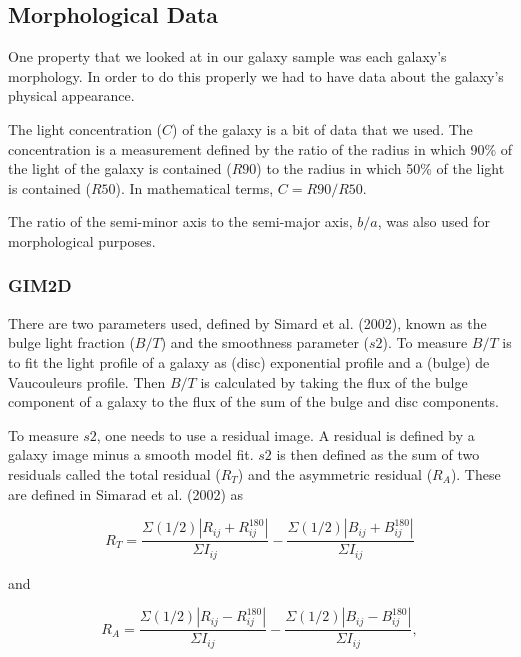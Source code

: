 \documentclass[showcase, preprintnumbers, amsmath, amssymb, bibnotes, 12pt]{revtex4}
\begin{document}
\subsection{Morphological Data}

One property that we looked at in our galaxy sample was each galaxy's morphology. In order to do this properly we had to have data about the galaxy's physical appearance.

The light concentration ($C$) of the galaxy is a bit of data that we used. The concentration is a measurement defined by the ratio of the radius in which 90\% of the light of the galaxy is contained ($R90$) to the radius in which 50\% of the light is contained ($R50$). In mathematical terms, $C=R90/R50$.

The ratio of the semi-minor axis to the semi-major axis, $b/a$, was also used for morphological purposes. %

\subsubsection{GIM2D}

There are two parameters used, defined by Simard et al. (2002), known as the bulge light fraction ($B/T$) and the smoothness parameter ($s2$). To measure $B/T$ is to fit the light profile of a galaxy as (disc) exponential profile and a (bulge) de Vaucouleurs profile. Then $B/T$ is calculated by taking the flux of the bulge component of a galaxy to the flux of the sum of the bulge and disc components. 

To measure $s2$, one needs to use a residual image. A residual is defined by a galaxy image minus a smooth model fit. $s2$ is then defined as the sum of two residuals called the total residual ($R_T$) and the asymmetric residual ($R_A$). These are defined in Simarad et al. (2002) as

\begin{equation}
R_T = \frac{\Sigma (1/2)|R_{ij} + R_{ij}^{180}|}{\Sigma I_{ij}} - \frac{\Sigma (1/2)|B_{ij} + B_{ij}^{180}|}{\Sigma I_{ij}}
\label{eq:total_residual}
\end{equation}

\noindent and

\begin{equation}
R_A = \frac{\Sigma (1/2)|R_{ij} - R_{ij}^{180}|}{\Sigma I_{ij}} - \frac{\Sigma (1/2)|B_{ij} - B_{ij}^{180}|}{\Sigma I_{ij}},
\label{eq:asymmetric_residual}
\end{equation}
\end{document}
